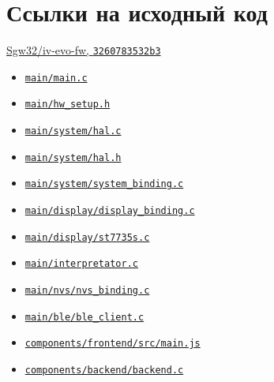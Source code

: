 \section{Ссылки на исходный код}
\href{https://github.com/Sgw32/iv-evo-fw/tree/3260783532b3d4ad8529b23f4e907c0a6ab03262}{Sgw32/iv-evo-fw, \texttt{3260783532b3}}
\begin{itemize}
\item \href{https://github.com/Sgw32/iv-evo-fw/blob/3260783532b3d4ad8529b23f4e907c0a6ab03262/main/main.c}{\nolinkurl{main/main.c}}
\item \href{https://github.com/Sgw32/iv-evo-fw/blob/3260783532b3d4ad8529b23f4e907c0a6ab03262/main/hw_setup.h}{\nolinkurl{main/hw_setup.h}}
\item \href{https://github.com/Sgw32/iv-evo-fw/blob/3260783532b3d4ad8529b23f4e907c0a6ab03262/main/system/hal.c}{\nolinkurl{main/system/hal.c}}
\item \href{https://github.com/Sgw32/iv-evo-fw/blob/3260783532b3d4ad8529b23f4e907c0a6ab03262/main/system/hal.h}{\nolinkurl{main/system/hal.h}}
\item \href{https://github.com/Sgw32/iv-evo-fw/blob/3260783532b3d4ad8529b23f4e907c0a6ab03262/main/system/system_binding.c}{\nolinkurl{main/system/system_binding.c}}
\item \href{https://github.com/Sgw32/iv-evo-fw/blob/3260783532b3d4ad8529b23f4e907c0a6ab03262/main/display/display_binding.c}{\nolinkurl{main/display/display_binding.c}}
\item \href{https://github.com/Sgw32/iv-evo-fw/blob/3260783532b3d4ad8529b23f4e907c0a6ab03262/main/display/st7735s.c}{\nolinkurl{main/display/st7735s.c}}
\item \href{https://github.com/Sgw32/iv-evo-fw/blob/3260783532b3d4ad8529b23f4e907c0a6ab03262/main/interpretator.c}{\nolinkurl{main/interpretator.c}}
\item \href{https://github.com/Sgw32/iv-evo-fw/blob/3260783532b3d4ad8529b23f4e907c0a6ab03262/main/nvs/nvs_binding.c}{\nolinkurl{main/nvs/nvs_binding.c}}
\item \href{https://github.com/Sgw32/iv-evo-fw/blob/3260783532b3d4ad8529b23f4e907c0a6ab03262/main/ble/ble_client.c}{\nolinkurl{main/ble/ble_client.c}}
\item \href{https://github.com/Sgw32/iv-evo-fw/blob/3260783532b3d4ad8529b23f4e907c0a6ab03262/components/frontend/src/main.js}{\nolinkurl{components/frontend/src/main.js}}
\item \href{https://github.com/Sgw32/iv-evo-fw/blob/3260783532b3d4ad8529b23f4e907c0a6ab03262/components/backend/backend.c}{\nolinkurl{components/backend/backend.c}}

\end{itemize}
